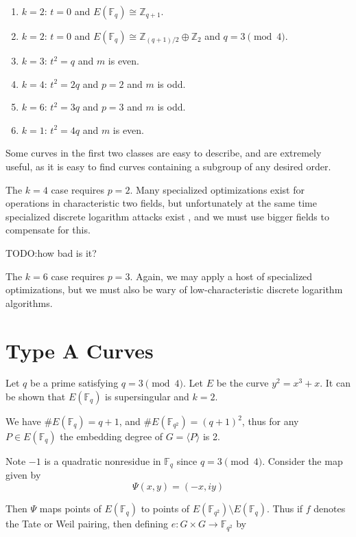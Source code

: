 \begin{enumerate}
\item
$k = 2$: $ t = 0$ and $E(\mathbb{F}_q) \cong \mathbb{Z}_{q+1}$.
\item
$k = 2$: $ t = 0$ and $E(\mathbb{F}_q) \cong \mathbb{Z}_{(q+1)/2} \oplus \mathbb{Z}_2$ and $q = 3 \pmod{4}$.
\item
$k = 3$: $ t^2 = q$ and $m$ is even.
\item
$k = 4$: $ t^2 = 2q$ and $p = 2$ and $m$ is odd.
\item
$k = 6$: $ t^2 = 3q$ and $p = 3$ and $m$ is odd.
\item
$k = 1$: $ t^2 = 4q$ and $m$ is even.
\end{enumerate}

Some curves in the first two classes are easy to describe, and are
extremely useful, as it is easy to find curves containing a
subgroup of any desired order.

The $k=4$ case requires $p=2$.
Many specialized optimizations exist for
operations in characteristic two fields,
but unfortunately at the same time specialized discrete logarithm attacks
exist \cite{coppersmith}, and we must use bigger fields to compensate for
this. 

TODO:how bad is it?

The $k=6$ case requires $p=3$. Again, we may apply
a host of specialized optimizations, but we must also be wary of
low-characteristic discrete logarithm algorithms.

\section {Type A Curves}

Let $q$ be a prime satisfying $q = 3 \pmod{4}$.
Let $E$ be the curve $y^2 = x^3 + x$. It can be shown \cite{silverman86}
that $E(\mathbb{F}_q)$ is supersingular and $k = 2$.

We have $\#E(\mathbb{F}_q) = q+1$, and $\#E(\mathbb{F}_{q^2}) = (q+1)^2$,
thus for any $P\in E(\mathbb{F}_q)$
the embedding degree of $G = \langle P \rangle$ is 2.

Note $-1$ is a quadratic nonresidue in $\mathbb{F}_q$ since $q = 3\pmod{4}$.
Consider the map given by
\[ \Psi(x, y) = (-x, i y) \]

Then $\Psi$ maps points of $E(\mathbb{F}_q)$ to points of
$E(\mathbb{F}_{q^2}) \setminus E(\mathbb{F}_q)$. Thus if $f$ denotes the
Tate or Weil pairing, then defining $e:G \times G \rightarrow \mathbb{F}_{q^2}$
by

